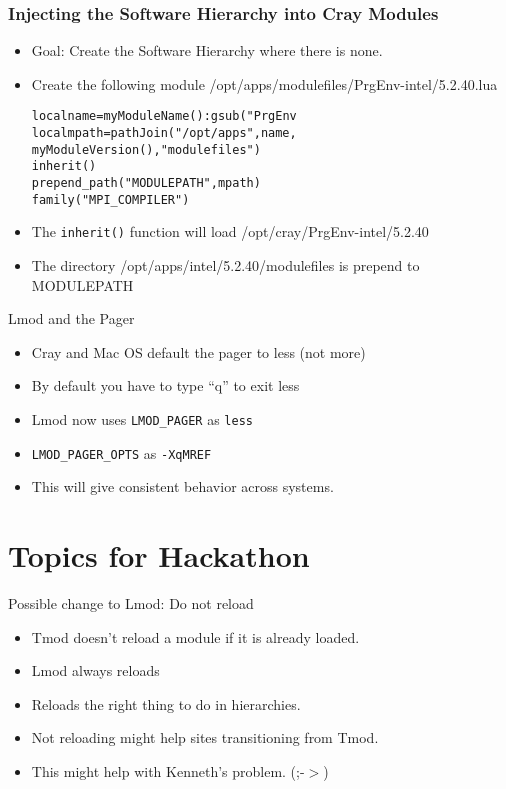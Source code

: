 \documentclass{beamer}
\begin{document}
\begin{frame}[fragile]
    \frametitle{Injecting the Software Hierarchy into Cray Modules}
  \begin{itemize}
    \item Goal: Create the Software Hierarchy where there is none.
    \item Create the following module /opt/apps/modulefiles/PrgEnv-intel/5.2.40.lua
  {\small
    \begin{alltt}

local name = myModuleName():gsub("PrgEnv%-","")
local mpath = pathJoin("/opt/apps",name,
              myModuleVersion(),"modulefiles")
inherit()
prepend_path("MODULEPATH",mpath)
family("MPI_COMPILER")
    \end{alltt}
}
    \item The \texttt{inherit()} function will load /opt/cray/PrgEnv-intel/5.2.40
    \item The directory /opt/apps/intel/5.2.40/modulefiles is prepend
      to MODULEPATH       
  \end{itemize}
\end{frame}

\begin{frame}{Lmod and the Pager}
  \begin{itemize}
    \item Cray and Mac OS default the pager to less (not more)
    \item By default you have to type ``q'' to exit less
    \item Lmod now uses \texttt{LMOD\_PAGER} as \texttt{less}
    \item \texttt{LMOD\_PAGER\_OPTS} as \texttt{-XqMREF}
    \item This will give consistent behavior across systems.
  \end{itemize}
\end{frame}


\section{Topics for Hackathon}

\begin{frame}{Possible change to Lmod: Do not reload}
  \begin{itemize}
    \item Tmod doesn't reload a module if it is already loaded.
    \item Lmod always reloads
    \item Reloads the right thing to do in hierarchies.
    \item Not reloading might help sites transitioning from Tmod.
    \item This might help with Kenneth's problem. (;-$>$)
  \end{itemize}
\end{frame}
\end{document}

